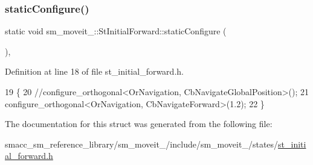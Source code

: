 \subsubsection{\texorpdfstring{static\+Configure()}{staticConfigure()}}
{\footnotesize\ttfamily static void sm\+\_\+moveit\+\_\+::\+St\+Initial\+Forward\+::static\+Configure (\begin{DoxyParamCaption}{ }\end{DoxyParamCaption})\hspace{0.3cm}{\ttfamily [inline]}, {\ttfamily [static]}}



Definition at line 18 of file st\+\_\+initial\+\_\+forward.\+h.


\begin{DoxyCode}
19         \{
20             \textcolor{comment}{//configure\_orthogonal<OrNavigation, CbNavigateGlobalPosition>();}
21             configure\_orthogonal<OrNavigation, CbNavigateForward>(1.2);
22         \}
\end{DoxyCode}


The documentation for this struct was generated from the following file\+:\begin{DoxyCompactItemize}
\item 
smacc\+\_\+sm\+\_\+reference\+\_\+library/sm\+\_\+moveit\+\_/include/sm\+\_\+moveit\+\_/states/\hyperlink{4_2include_2sm__moveit__4_2states_2st__initial__forward_8h}{st\+\_\+initial\+\_\+forward.\+h}\end{DoxyCompactItemize}

